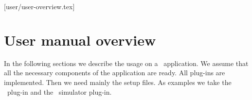 [user/user-overview.tex]
\section{User manual overview}
In the following sections we describe the usage on a \dabc\ application.
We assume that all the necessary components of the application are ready.
All plug-ins are implemented. Then we need mainly the setup files.
As examples we take the \mbs\ plug-in and the \dabc\ simulator plug-in.
